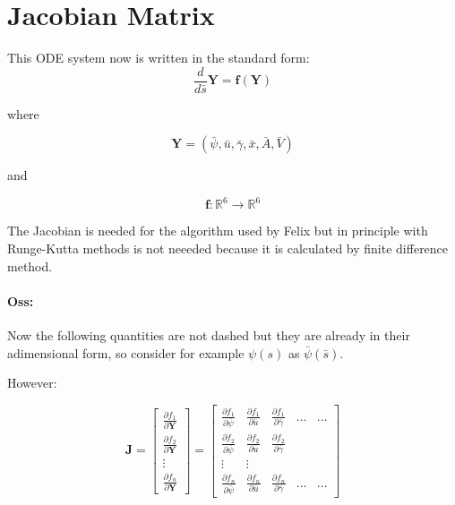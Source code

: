\documentclass[12pt]{article}
\begin{document}
\appendix
\section{Jacobian Matrix}
This ODE system now is written in the standard form:
$$
\frac{d}{d\bar{s}} \mathbf{Y} = \mathbf{f} (\mathbf{Y})
$$

where 

$$
\mathbf{Y} = (\bar{\psi},\bar{u},\bar{\gamma},\bar{x},\bar{A},\bar{V})
$$

and 

$$
\mathbf{f}:\mathbb{R}^6 \to \mathbb{R}^6
$$


The Jacobian is needed for the algorithm used by Felix but in principle with Runge-Kutta methods is not neeeded because it is calculated by finite difference method.

\paragraph{Oss:} Now the following quantities are not dashed but they are already in their adimensional form, so consider for example $\psi(s)$ as $\bar{\psi}(\bar{s})$.

However:

$$
\mathbf{J} = \begin{bmatrix}
  \frac{\partial f_1}{\partial \mathbf{Y}} \\[1ex]
  \frac{\partial f_2}{\partial \mathbf{Y}} \\[1ex] 
  \vdots \\[1ex] 
  \frac{\partial f_n}{\partial \mathbf{Y}}
\end{bmatrix}=%
\begin{bmatrix}
    \frac{\partial f_1}{\partial \bar{\psi}} & 
      \frac{\partial f_1}{\partial \bar{u}} & 
      \frac{\partial f_1}{\partial \bar{\gamma}} & \dots & \dots \\[1ex] %
    \frac{\partial f_2}{\partial \bar{\psi}} & 
      \frac{\partial f_2}{\partial \bar{u}} & 
      \frac{\partial f_2}{\partial \bar{\gamma}} \\[1ex]

      \vdots & \vdots \\[1ex]
      \frac{\partial f_n}{\partial\bar{\psi}} & 
      \frac{\partial f_n}{\partial \bar{u}} & 
      \frac{\partial f_n}{\partial \bar{\gamma}}& \dots & \dots
  \end{bmatrix}
$$
\end{document}
